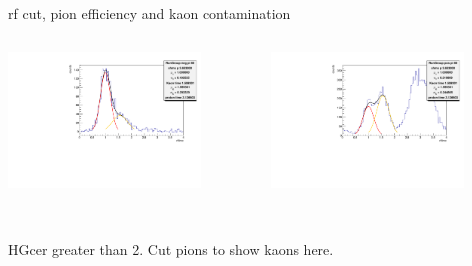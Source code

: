 \documentclass[aspectratio=169,xcolor=dvipsnames]{beamer}
\begin{document}
\begin{frame}{rf cut, pion efficiency and kaon contamination}
  \begin{columns}
    \begin{column}[T]{0.5\textwidth}
  \includegraphics[width = 0.8\textwidth]{results/pid/rftime/rftime_neg_80.pdf}
\end{column}
\begin{column}[T]{0.5\textwidth}
  \includegraphics[width = 0.8\textwidth]{results/pid/rftime/rftime_pos_80.pdf}
\end{column}
\end{columns}
\\
HGcer greater than 2. Cut pions to show kaons here.
\end{frame}
\end{document}
